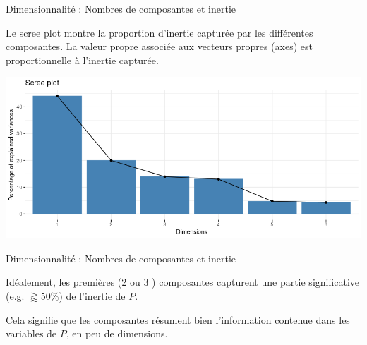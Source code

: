 \documentclass{beamer}
\begin{document}
\begin{frame}{Dimensionnalité : Nombres de composantes et inertie}


Le \alert{scree plot} montre la proportion d'inertie capturée par les différentes composantes. 
La valeur propre associée aux vecteurs propres (axes) est proportionnelle à l'inertie capturée.

\centering
\includegraphics[width=\textwidth,keepaspectratio]{img/scree_plot.png}



\end{frame}



\begin{frame}{Dimensionnalité : Nombres de composantes et inertie}


\alert{Idéalement}, les premières (2 ou 3 ) composantes capturent une partie significative (e.g. $\gtrapprox50\%$) de l'inertie de $P$.


\medskip


Cela signifie que les composantes \alert{résument bien} l'information contenue dans les variables de $P$, en \alert{peu de dimensions}.

\end{frame}
\end{document}
